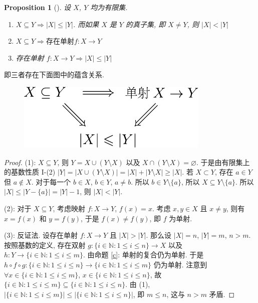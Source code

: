 \documentclass[UTF8]{ctexart}
\theoremstyle{mystyle}
\newtheorem{proposition}{Proposition}[section]
\theoremstyle{myremark}
\theoremstyle{plain}
\newcommand{\N}{\mathbb N}
\newcommand{\set}[1]{\{#1\}}
\begin{document}
\begin{proposition}[] \label{cardinal I}
    设 $ X $, $ Y $ 均为有限集.
    \begin{enumerate}
        \item $ X \subseteq Y \Longrightarrow |X| \leqslant |Y| $. 而如果 $ X $ 是 $ Y $ 的真子集, 即 $ X \neq Y $, 则 $ |X| < |Y| $
        \item $ X \subseteq Y \Longrightarrow \text{存在单射} f \colon X \to Y $
        \item 存在单射 $ f\colon X \to Y \Longrightarrow |X| \leqslant |Y| $ 
    \end{enumerate}
\end{proposition}
即三者存在下面图中的蕴含关系.

\begin{figure}[H]
    \centering
    \includegraphics[width = 0.4\linewidth]{./images/implies.pdf}
\end{figure}

\begin{proof}
    (1): $ X \subseteq Y $, 则 $ Y = X \cup (Y \setminus X) $ 以及 $ X \cap (Y \setminus X) = \varnothing $. 于是由有限集上的基数性质 I-(2) $ |Y| = |X \cup (Y \setminus X)| = |X| + |Y \setminus X| \geqslant |X| $. 若 $ X \subset Y $, 存在 $ a \in Y $ 但 $ a \notin X $. 对于每一个 $ b \in X $, $ b \in Y $, $ a \neq b $. 所以 $ b \in Y \setminus \set{a} $, 所以 $ X \subseteq Y \setminus \set{a} $. 所以 $ |X| \leqslant |Y - \set{a}| = |Y| - 1 $, 则 $ |X| < |Y| $.

    (2): 对于 $ X \subseteq Y $, 考虑映射 $ f\colon X \to Y $, $ f(x) = x $. 考虑 $ x, y \in X $ 且 $ x \neq y $, 则有 $ x = f(x) $ 和 $ y = f(y) $, 于是 $ f(x) \neq f(y) $, 即 $ f $ 为单射.

    (3): 反证法. 设存在单射 $ f \colon X \to Y $ 且 $ |X| > |Y| $. 那么设 $ |X| = n $, $ |Y| = m $, $ n > m $. 按照基数的定义, 存在双射 $ g \colon \set{i \in \N \colon 1 \leqslant i \leqslant n} \to X $ 以及 $ h \colon Y \to \set{i \in \N \colon 1 \leqslant i \leqslant m} $. 由命题 \ref{c}: 单射的复合仍为单射. 于是 $ h \circ f \circ g \colon \set{i \in \N \colon 1 \leqslant i \leqslant n} \to \set{i \in \N \colon 1 \leqslant i \leqslant m} $ 仍为单射. 注意到 $ \forall x \in \set{i \in \N \colon 1 \leqslant i \leqslant m} $, $ x \in \set{i \in \N \colon 1 \leqslant i \leqslant n} $, 故 $ \set{i \in \N \colon 1 \leqslant i \leqslant m} \subseteq \set{i \in \N \colon 1 \leqslant i \leqslant n} $. 由 (1), $ |\set{i \in \N \colon 1 \leqslant i \leqslant m}| \leqslant |\set{i \in \N \colon 1 \leqslant i \leqslant n}| $, 即 $ m \leqslant n $, 这与 $ n > m $ 矛盾.
\end{proof}
\end{document}
